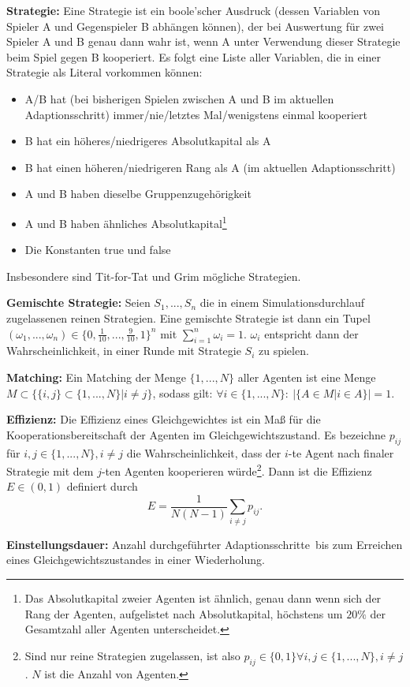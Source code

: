\documentclass[parskip=full,11pt]{scrartcl}
\def\adapt{Adaptionsschritt}
\def\adapts{Adaptionsschritte}
\begin{document}
\textbf{Strategie:}
Eine Strategie ist ein boole'scher Ausdruck (dessen Variablen von Spieler A und Gegenspieler B abhängen können), der bei Auswertung für zwei Spieler A und B genau dann wahr ist, wenn A unter Verwendung dieser Strategie beim Spiel gegen B kooperiert. Es folgt eine Liste aller Variablen, die in einer Strategie als Literal vorkommen können:
\begin{itemize}
\item A/B hat (bei bisherigen Spielen zwischen A und B im aktuellen \adapt) immer/nie/letztes Mal/wenigstens einmal kooperiert
\item B hat ein höheres/niedrigeres Absolutkapital als A
\item B hat einen höheren/niedrigeren Rang als A (im aktuellen \adapt)
\item A und B haben dieselbe Gruppenzugehörigkeit
\item A und B haben ähnliches Absolutkapital\footnote{Das Absolutkapital zweier Agenten ist ähnlich, genau dann wenn sich der Rang der Agenten, aufgelistet nach Absolutkapital, höchstens um \(20\%\) der Gesamtzahl aller Agenten unterscheidet.}
\item Die Konstanten true und false
\end{itemize}
Insbesondere sind Tit-for-Tat und Grim mögliche Strategien.

\textbf{Gemischte Strategie:}
Seien \(S_1,...,S_n\) die in einem Simulationsdurchlauf zugelassenen reinen Strategien. Eine gemischte Strategie ist dann ein Tupel \((\omega_1,...,\omega_n) \in \{0,\frac{1}{10},...,\frac{9}{10},1\}^n\) mit \(\sum_{i=1}^n \omega_i = 1\). \(\omega_i\) entspricht dann der Wahrscheinlichkeit, in einer Runde mit Strategie \(S_i\) zu spielen.

\textbf{Matching:}
Ein Matching der Menge \(\{1,...,N\}\) aller Agenten ist eine Menge \(M \subset \{\{i,j\} \subset \{1,...,N\} | i \neq j\}\), sodass gilt: \(\forall i \in \{1,...,N\}: \ |\{A \in M | i \in A\}| = 1\).

\textbf{Effizienz:}
Die Effizienz eines Gleichgewichtes ist ein Maß für die Kooperationsbereitschaft der Agenten im Gleichgewichtszustand. Es bezeichne \(p_{ij}\) für \(i,j \in \{1,...,N\}, i \neq j\) die Wahrscheinlichkeit, dass der \(i\)-te Agent nach finaler Strategie mit dem \(j\)-ten Agenten kooperieren würde\footnote{Sind nur reine Strategien zugelassen, ist also \(p_{ij} \in \{0,1\} \forall i,j \in \{1,...,N\}, i \neq j\). \(N\) ist die Anzahl von Agenten.}. Dann ist die Effizienz \(E \in (0,1)\) definiert durch
\[
E = \frac{1}{N(N - 1)} \sum_{i \neq j} p_{ij}.
\]

\textbf{Einstellungsdauer:}
Anzahl durchgeführter \adapts\ bis zum Erreichen eines Gleichgewichtszustandes in einer Wiederholung.
\end{document}
